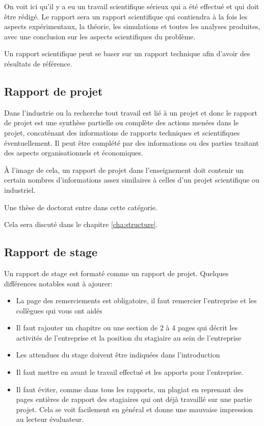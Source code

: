 On voit ici qu'il y a eu un travail scientifique sérieux qui a été effectué et qui doit être rédigé.
Le rapport sera un rapport scientifique qui contiendra à la fois les aspects expérimentaux, la théorie, les simulations et toutes les analyses produites,
 avec une conclusion sur les aspects scientifiques du problème.

Un rapport scientifique peut se baser sur un rapport technique afin d'avoir des résultats de référence.


\subsection{Rapport de projet}

Dans l'industrie ou la recherche tout travail est lié à un projet
 et donc le rapport de projet est une synthèse  partielle ou complète 
 des actions menées dans le projet, concaténant des informations de rapports techniques et scientifiques éventuellement.
 Il peut être complété par des informations ou des parties traitant des aspects organisationnels et économiques.

\`A l'image de cela, un rapport de projet dans l'enseignement doit contenir un certain nombres d'informations assez similaires à celles d'un projet
scientifique ou industriel.

Une  thèse  de doctorat entre  dans cette catégorie.

Cela sera discuté dans le chapitre \ref{cha:structure}. 


\subsection{Rapport de stage}

Un rapport de stage est formaté comme un rapport de projet. Quelques différences notables sont à ajourer:
\begin{itemize}
\item La page des remerciements est obligatoire, il faut remercier l'entreprise et les collègues qui vous ont aidés
\item Il faut rajouter un chapitre ou une section de 2 à 4 pages qui décrit les activités de l'entreprise et la position du stagiaire au sein de l'entreprise
\item Les attendues du stage doivent être indiquées dans l'introduction
\item Il faut mettre en avant le travail effectué et les apports pour l'entreprise.
\item Il faut éviter, comme dans tous les rapports, un plagiat en reprenant des pages entières de rapport des stagiaires
 qui ont déjà travaillé sur une partie projet. Cela se voit facilement en général et donne une mauvaise impression au lecteur évaluateur.
\end{itemize}

